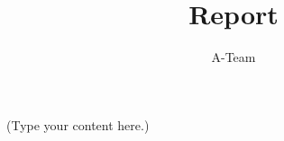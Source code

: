 \documentclass{article}
\title{Report}
\author{A-Team}
\begin{document}
\maketitle
(Type your content here.)
\end{document}
